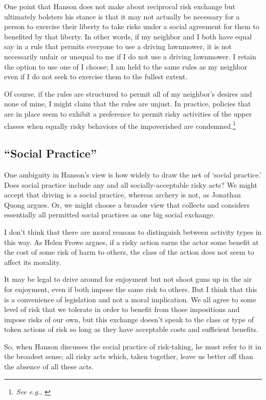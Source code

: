 One point that Hanson does not make about reciprocal risk exchange but
ultimately bolsters his stance is that it may not actually be necessary for a
person to exercise their liberty to take risks under a social agreement for
them to benefited by that liberty. In other words, if my neighbor and I both
have equal say in a rule that permits everyone to use a driving lawnmower, it
is not necessarily unfair or unequal to me if I do not use a driving lawnmower.
I retain the option to use one of I choose; I am held to the same rules as my
neighbor even if I do not seek to exercise them to the fullest extent.

Of course, if the rules are structured to permit all of my neighbor’s desires
and none of mine, I might claim that the rules are unjust. In practice,
policies that are in place seem to exhibit a preference to permit risky
activities of the upper classes when equally risky behaviors of the
impoverished are condemned.\footnote{\emph{See e.g.,} \cite[Ch. 1]{pl}}

\subsection{“Social Practice”}

One ambiguity in Hanson’s view is how widely to draw the net of ‘social
practice.’ Does social practice include any and all socially-acceptable risky
acts? We might accept that driving is a social practice, whereas archery is
not, as Jonathan Quong argues.\autocite[35,50]{quong} Or, we might choose a
broader view that collects and considers essentially all permitted social
practices as one big social exchange.

I don’t think that there are moral reasons to distinguish between activity
types in this way. As Helen Frowe argues, if a risky action earns the actor
some benefit at the cost of some risk of harm to others, the class of the
action does not seem to affect its morality.\autocite[9]{frowe}

It may be legal to drive around for enjoyment but not shoot guns up in the air
for enjoyment, even if both impose the same risk to others. But I think that
this is a convenience of legislation and not a moral implication. We all agree
to some level of risk that we tolerate in order to benefit from those
impositions and impose risks of our own, but this exchange doesn’t speak to the
class or type of token actions of risk so long as they have acceptable costs
and sufficient benefits.

So, when Hanson discusses the social practice of risk-taking, he must refer to
it in the broadest sense; all risky acts which, taken together, leave us better
off than the absence of all these acts.

